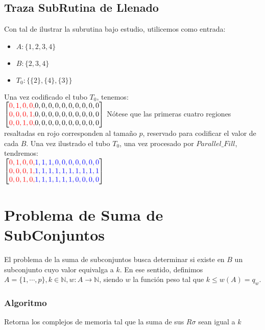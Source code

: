 \documentclass[12pt, letterpaper, twoside]{article}
\begin{document}
   \subsection{Traza SubRutina de Llenado}
   Con tal de ilustrar la subrutina bajo estudio, utilicemos como entrada:
   \begin{itemize}
       \item $A: \{1, 2, 3, 4\}$
       \item $B: \{2, 3, 4\}$
       \item $T_0: \{\{2\}, \{4\}, \{3\}\}$
    \end{itemize}
    Una vez codificado el tubo $T_0$, tenemos: \\
    $
       \begin{bmatrix}
        \textcolor{red}{0, 1, 0, 0,} 0, 0, 0, 0, 0, 0, 0, 0, 0, 0 \\
        \textcolor{red}{0, 0, 0, 1,} 0, 0, 0, 0, 0, 0, 0, 0, 0, 0 \\
        \textcolor{red}{0, 0, 1, 0,} 0, 0, 0, 0, 0, 0, 0, 0, 0, 0
        \end{bmatrix}
    $
    Nótese que las primeras cuatro regiones resaltadas en rojo corresponden al tamaño $p$, reservado para codificar el valor de cada $B$. Una vez ilustrado el tubo $T_0$, una vez procesado por $Parallel\_Fill$, tendremos: \\
    $
        \begin{bmatrix}
            \textcolor{red}{0, 1, 0, 0,} \textcolor{blue}{1, 1, 1, 0, 0, 0, 0, 0, 0, 0} \\
            \textcolor{red}{0, 0, 0, 1,} \textcolor{blue}{1, 1, 1, 1, 1, 1, 1, 1, 1, 1} \\
            \textcolor{red}{0, 0, 1, 0,} \textcolor{blue}{1, 1, 1, 1, 1, 1, 0, 0, 0, 0}
        \end{bmatrix}
    $
    \section{Problema de Suma de SubConjuntos}
    El problema de la suma de subconjuntos busca determinar si existe en $B$ un subconjunto cuyo valor equivalga a $k$. En ese sentido, definimos $A=\{1,\cdots,p\}, k\in\mathbb{N}, w:A\rightarrow\mathbb{N}$, siendo $w$ la función peso tal que $k\leq w(A)=q_w$.
    \subsubsection{Algoritmo}
    \begin{algorithm}
        \caption{Retorna los complejos de memoria tal que la suma de sus $R\sigma$ sean igual a $k$}
        \label{SubsetSum}
        \begin{algorithmic}[1]
            \EndProcedure
        \end{algorithmic}
    \end{algorithm}
\end{document}
